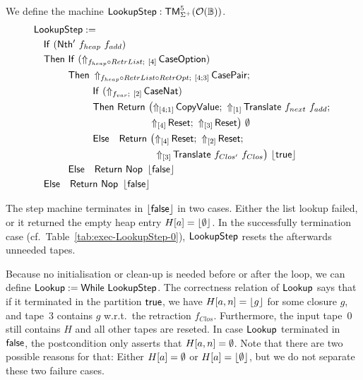 \begin{definition}
  \label{def:Lookup_Step}
  We define the machine $\mathsf{LookupStep} : \mathsf{TM}_{\Sigma^+}^5(\mathcal{O}(\mathbb{B}))$.
  \begin{align*}
    & \MS{LookupStep} := \\
    & \quad \MS{If}~(\MS{Nth'}~f_{heap}~f_{add}) \\
    & \quad \MS{Then}~\MS{If}~(\LiftBoth{\MS{CaseOption}}{f_{heap} \circ RetrList}{\Vector{4}}) \\
    & \quad \phantom{\MS{Then}}~\MS{Then}~\LiftBoth{\MS{CasePair}}{f_{heap} \circ RetrList \circ RetrOpt}{\Vector{4;3}} \Seq \\
    & \quad \phantom{\MS{Then}~\MS{Then}}~\MS{If}~(\LiftBoth{\MS{CaseNat}}{f_{var}}{\Vector{2}}) \\
    & \quad \phantom{\MS{Then}~\MS{Then}}~\MS{Then}~ \MS{Return}~\bigl(
      \LiftTapes{\MS{CopyValue}}{\Vector{4;1}} \Seq
      \LiftTapes{\MS{Translate}~f_{next}~f_{add}}{\Vector{1}} \Seq \\
    & \quad \phantom{\MS{Then}~\MS{Then}~\MS{Then}~\MS{Return}\bigl(}
      \LiftTapes{\MS{Reset}}{\Vector{4}} \Seq
      \LiftTapes{\MS{Reset}}{\Vector{3}}
      \bigr)~{\None} \\
    & \quad \phantom{\MS{Then}~\MS{Then}}~\MS{Else}~~~ \MS{Return}~\bigl(
      \LiftTapes{\MS{Reset}}{\Vector{4}} \Seq
      \LiftTapes{\MS{Reset}}{\Vector{2}} \Seq \\
    & \quad \phantom{\phantom{\MS{Then}~\MS{Then}}~\MS{Else}~~~\MS{Return}~\bigl(}
      \LiftTapes{\MS{Translate}~f_{Clos'}~f_{Clos}}{\Vector{3}}
      \bigr)~{\Some\true} \\
    & \quad \phantom{\MS{Then}}~\MS{Else}~~~ \Return{\Nop}{\Some\false} \\
    & \quad \MS{Else}~~~ \Return{\Nop}{\Some\false}
  \end{align*}
\end{definition}

The step machine terminates in $\left\lfloor {\ensuremath{\mathsf{false}}} \right\rfloor$ in two cases.  Either the list lookup failed, or it returned the empty heap entry $H[a]=\left\lfloor {\emptyset} \right\rfloor$.  In
the successfully termination case (cf.\ Table~\ref{tab:exec-LookupStep-0}), $\mathsf{LookupStep}$ resets the afterwards unneeded tapes.

Because no initialisation or clean-up is needed before or after the loop, we can define $\mathsf{Lookup} := \mathsf{While}~\mathsf{LookupStep}$.  The correctness
relation of $\mathsf{Lookup}$ says that if it terminated in the partition $\mathsf{true}$, we have $H[a,n] = \left\lfloor {g} \right\rfloor$ for some closure $g$, and tape~$3$ contains
$g$ w.r.t.\ the retraction $f_{Clos}$.  Furthermore, the input tape~$0$ still contains $H$ and all other tapes are reseted.  In case $\mathsf{Lookup}$
terminated in $\mathsf{false}$, the postcondition only asserts that $H[a,n]=\emptyset$.  Note that there are two possible reasons for that: Either $H[a]=\emptyset$ or
$H[a]=\left\lfloor {\emptyset} \right\rfloor$, but we do not separate these two failure cases.

